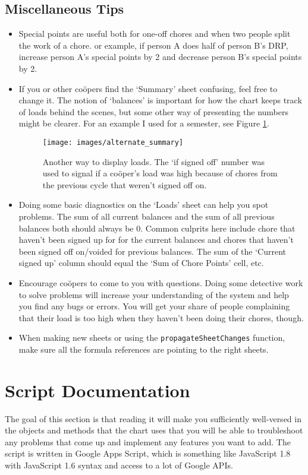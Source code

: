 \documentclass{article}
\begin{document}
\subsection{Miscellaneous Tips}
\begin{itemize}
\item
Special points are useful both for one-off chores and when two people split the work of a chore.
or example, if person A does half of person B's DRP, increase person A's special points by 2 and decrease person B's special points by 2.
\item
If you or other co\"{o}pers find the `Summary' sheet confusing, feel free to change it.
The notion of `balances' is important for how the chart keeps track of loads behind the scenes, but some other way of presenting the numbers might be clearer.
For an example I used for a semester, see Figure \ref{fig:example}.

\begin{figure}[h]
\centering
\texttt{[image: images/alternate\_summary]}
\caption{%
Another way to display loads.
The `if signed off' number was used to signal if a co\"{o}per's load was high because of chores from the previous cycle that weren't signed off on.%
}
\label{fig:example}
\end{figure}

\item 
Doing some basic diagnostics on the `Loads' sheet can help you spot problems.
The sum of all current balances and the sum of all previous balances both should always be 0.
Common culprits here include chore that haven't been signed up for for the current balances and chores that haven't been signed off on/voided for previous balances.
The sum of the `Current signed up' column should equal the `Sum of Chore Points' cell, etc.
\item
Encourage co\"{o}pers to come to you with questions.
Doing some detective work to solve problems will increase your understanding of the system and help you find any bugs or errors.
You will get your share of people complaining that their load is too high when they haven't been doing their chores, though.
\item
When making new sheets or using the \texttt{propagateSheetChanges} function, make sure all the formula references are pointing to the right sheets.
\end{itemize}

\section{Script Documentation}
The goal of this section is that reading it will make you sufficiently well-versed in the objects and methods that the chart uses that you will be able to troubleshoot any problems that come up and implement any features you want to add.
The script is written in Google Apps Script, which is something like JavaScript 1.8 with JavaScript 1.6 syntax and access to a lot of Google APIs.
\end{document}
